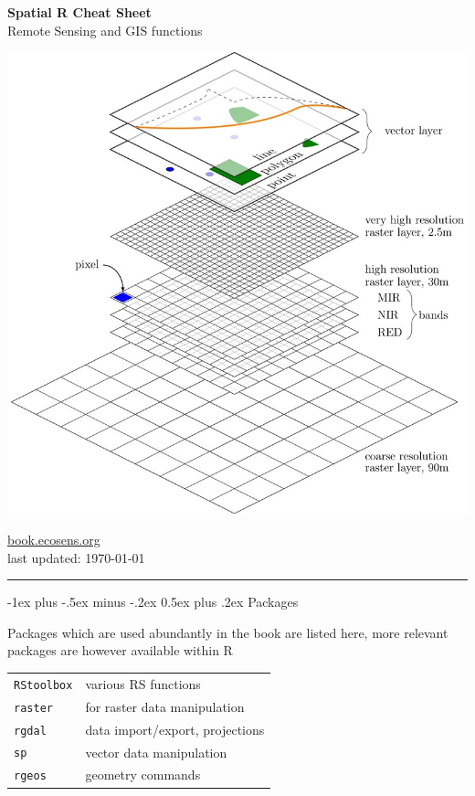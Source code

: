 \documentclass[10pt,landscape]{article}
\makeatletter
\renewcommand{\section}{\@startsection{section}{1}{0mm}%
                                {-1ex plus -.5ex minus -.2ex}%
                                {0.5ex plus .2ex}%
                                {\normalfont\large\bfseries}}
\makeatother
\begin{document}
\newlength{\MyLen}


\raggedright
\footnotesize
\begin{multicols}{3}


\setlength{\premulticols}{1pt}
\setlength{\postmulticols}{1pt}
\setlength{\multicolsep}{1pt}
\setlength{\columnsep}{2pt}

\begin{center}
     \Large{\textbf{Spatial R Cheat Sheet}} \\
     Remote Sensing and GIS functions
\end{center}

\begin{center}
 \includegraphics[width=.25\textwidth]{pics/RS_GIS_Ecology_book_wegmann_leutner_dech_book_ecosens_org_Spatial_Layer_Model.jpg}
\end{center}


\url{book.ecosens.org}\\
last updated: \today

\rule{0.32\textwidth}{0.4pt}


\section{Packages}

Packages which are used abundantly in the book are listed here, more relevant packages are however available within R

 \bigskip
 
\begin{tabular}{@{}ll@{}}
\verb!RStoolbox!    & various RS functions  \\
\verb!raster!    & for raster data manipulation \\
\verb!rgdal!  & data import/export, projections \\

\verb!sp!     & vector data manipulation \\
\verb!rgeos!  & geometry commands \\


\end{tabular}
\end{multicols}
\end{document}
